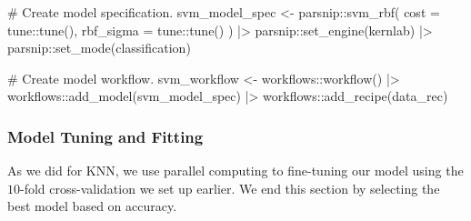 \documentclass[
  letterpaper,
  DIV=11,
  numbers=noendperiod]{scrartcl}
\newenvironment{Shaded}{\begin{snugshade}}{\end{snugshade}}
\newcommand{\AttributeTok}[1]{\textcolor[rgb]{0.40,0.45,0.13}{#1}}
\newcommand{\CommentTok}[1]{\textcolor[rgb]{0.37,0.37,0.37}{#1}}
\newcommand{\FunctionTok}[1]{\textcolor[rgb]{0.28,0.35,0.67}{#1}}
\newcommand{\NormalTok}[1]{\textcolor[rgb]{0.00,0.23,0.31}{#1}}
\newcommand{\OtherTok}[1]{\textcolor[rgb]{0.00,0.23,0.31}{#1}}
\newcommand{\SpecialCharTok}[1]{\textcolor[rgb]{0.37,0.37,0.37}{#1}}
\newcommand{\StringTok}[1]{\textcolor[rgb]{0.13,0.47,0.30}{#1}}
\begin{document}
\begin{Shaded}
\begin{Highlighting}[]
\CommentTok{\# Create model specification.}
\NormalTok{svm\_model\_spec }\OtherTok{\textless{}{-}}
\NormalTok{  parsnip}\SpecialCharTok{::}\FunctionTok{svm\_rbf}\NormalTok{(}
    \AttributeTok{cost =}\NormalTok{ tune}\SpecialCharTok{::}\FunctionTok{tune}\NormalTok{(),}
    \AttributeTok{rbf\_sigma =}\NormalTok{ tune}\SpecialCharTok{::}\FunctionTok{tune}\NormalTok{()}
\NormalTok{  ) }\SpecialCharTok{|\textgreater{}}
\NormalTok{  parsnip}\SpecialCharTok{::}\FunctionTok{set\_engine}\NormalTok{(}\StringTok{\textquotesingle{}kernlab\textquotesingle{}}\NormalTok{) }\SpecialCharTok{|\textgreater{}}
\NormalTok{  parsnip}\SpecialCharTok{::}\FunctionTok{set\_mode}\NormalTok{(}\StringTok{\textquotesingle{}classification\textquotesingle{}}\NormalTok{)}

\CommentTok{\# Create model workflow.}
\NormalTok{svm\_workflow }\OtherTok{\textless{}{-}}\NormalTok{ workflows}\SpecialCharTok{::}\FunctionTok{workflow}\NormalTok{() }\SpecialCharTok{|\textgreater{}}
\NormalTok{  workflows}\SpecialCharTok{::}\FunctionTok{add\_model}\NormalTok{(svm\_model\_spec) }\SpecialCharTok{|\textgreater{}}
\NormalTok{  workflows}\SpecialCharTok{::}\FunctionTok{add\_recipe}\NormalTok{(data\_rec)}
\end{Highlighting}
\end{Shaded}

\subsubsection{Model Tuning and
Fitting}\label{model-tuning-and-fitting-1}

As we did for KNN, we use parallel computing to fine-tuning our model
using the \(10\)-fold cross-validation we set up earlier. We end this
section by selecting the best model based on accuracy.
\end{document}
